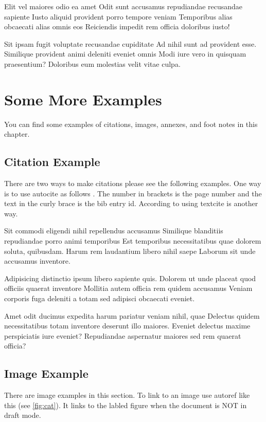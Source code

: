 \documentclass[
    14pt,
    letterpaper,
]{extreport}
\begin{document}
Elit vel maiores odio ea amet Odit sunt accusamus repudiandae recusandae sapiente Iusto aliquid provident porro tempore veniam Temporibus alias obcaecati alias omnis eos Reiciendis impedit rem officia doloribus iusto!

Sit ipsam fugit voluptate recusandae cupiditate Ad nihil sunt ad provident esse. Similique provident animi deleniti eveniet omnis Modi iure vero in quisquam praesentium? Doloribus eum molestias velit vitae culpa.

\chapter{Some More Examples}

You can find some examples of citations, images, annexes, and foot notes in this chapter.

\section{Citation Example}

There are two ways to make citations please see the following examples. One way
is to use autocite as follows \autocite[1]{johnjane2010}. The number in brackets
is the page number and the text in the curly brace is the bib entry id. According
to \textcite[15--20]{delacruzsantos2011} using textcite is another way.

Sit commodi \autocite[10]{johnjane2012} eligendi nihil repellendus accusamus Similique blanditiis repudiandae porro animi temporibus Est temporibus necessitatibus quae dolorem soluta, quibusdam. Harum rem laudantium libero nihil saepe Laborum sit unde accusamus inventore.

Adipisicing \autocite{examplecom} distinctio ipsum libero sapiente quis. Dolorem ut unde placeat quod officiis quaerat inventore Mollitia autem officia rem quidem accusamus Veniam corporis fuga deleniti a totam sed adipisci obcaecati eveniet.

Amet odit ducimus expedita harum pariatur veniam nihil, quae Delectus quidem necessitatibus totam inventore deserunt illo maiores. Eveniet delectus maxime perspiciatis iure eveniet? Repudiandae aspernatur maiores sed rem quaerat officia?

\section{Image Example}

There are image examples in this section. To link to an image use autoref like
this (see \autoref{fig:cat}). It links to the labled figure when the document
is NOT in draft mode.
\end{document}
